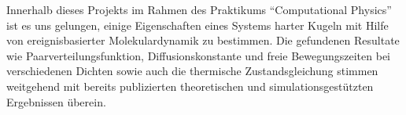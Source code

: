 Innerhalb dieses Projekts im Rahmen des Praktikums ``Computational Physics'' ist es uns gelungen, einige Eigenschaften eines Systems harter Kugeln mit Hilfe von ereignisbasierter Molekulardynamik zu bestimmen. Die gefundenen Resultate wie Paarverteilungsfunktion, Diffusionskonstante und freie Bewegungszeiten bei verschiedenen Dichten sowie auch die thermische Zustandsgleichung stimmen weitgehend mit bereits publizierten theoretischen und simulationsgestützten Ergebnissen überein.  